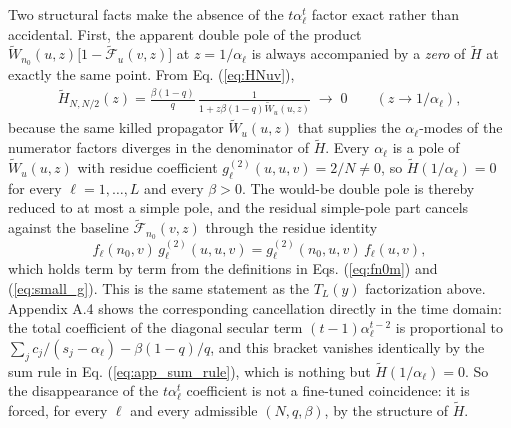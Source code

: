 \documentclass[superscriptaddress, amsmath, amssymb, aps, pre, floatfix]{revtex4-2}
\begin{document}
Two structural facts make the absence of the \(t\alpha_\ell^t\) factor exact rather than accidental.
First, the apparent double pole of the product \(\widetilde W_{n_0}(u,z)\bigl[1-\widetilde{\mathcal F}_u(v,z)\bigr]\) at \(z=1/\alpha_\ell\) is always accompanied by a \emph{zero} of \(\widetilde H\) at exactly the same point.  From Eq. (\ref{eq:HNuv}),
\begin{align}
\widetilde H_{N,N/2}(z)=\frac{\beta(1-q)}{q}\,
\frac{1}{1+z\beta(1-q)\widetilde W_u(u,z)}
\;\longrightarrow\;0
\qquad (z\to1/\alpha_\ell),
\label{eq:H_zero_at_alpha}
\end{align}
because the same killed propagator \(\widetilde W_u(u,z)\) that supplies the \(\alpha_\ell\)-modes of the numerator factors diverges in the denominator of \(\widetilde H\).  Every \(\alpha_\ell\) is a pole of \(\widetilde W_u(u,z)\) with residue coefficient \(g^{(2)}_\ell(u,u,v)=2/N\neq0\), so \(\widetilde H(1/\alpha_\ell)=0\) for every \(\ell=1,\ldots,L\) and every \(\beta>0\).  The would-be double pole is thereby reduced to at most a simple pole, and the residual simple-pole part cancels against the baseline \(\widetilde{\mathcal F}_{n_0}(v,z)\) through the residue identity
\[
  f_\ell(n_0,v)\,g^{(2)}_\ell(u,u,v)=g^{(2)}_\ell(n_0,u,v)\,f_\ell(u,v),
\]
which holds term by term from the definitions in Eqs. (\ref{eq:fn0m}) and (\ref{eq:small_g}).  This is the same statement as the \(T_L(y)\) factorization above.  Appendix A.4 shows the corresponding cancellation directly in the time domain: the total coefficient of the diagonal secular term \((t-1)\alpha_\ell^{t-2}\) is proportional to \(\sum_j c_j/(s_j-\alpha_\ell)-\beta(1-q)/q\), and this bracket vanishes identically by the sum rule in Eq. (\ref{eq:app_sum_rule}), which is nothing but \(\widetilde H(1/\alpha_\ell)=0\).  So the disappearance of the \(t\alpha_\ell^t\) coefficient is not a fine-tuned coincidence: it is forced, for every \(\ell\) and every admissible \((N,q,\beta)\), by the structure of \(\widetilde H\).
\end{document}
